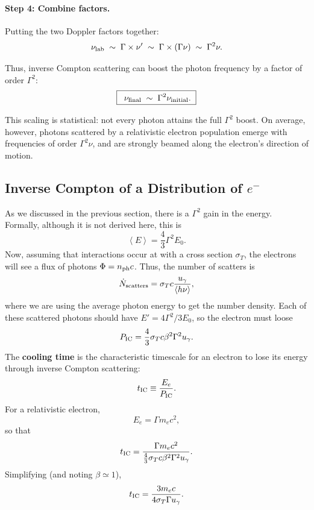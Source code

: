 \paragraph{Step 4: Combine factors.}
Putting the two Doppler factors together:
\[
    \nu_{\rm lab} \;\sim\; \Gamma \times \nu' \;\sim\; \Gamma \times (\Gamma\nu) \;\sim\; \Gamma^2 \nu.
\]

Thus, inverse Compton scattering can boost the photon frequency by a
factor of order $\Gamma^2$:
\begin{equation}
    \boxed{\;\;\nu_{\rm final} \;\sim\; \Gamma^2 \nu_{\rm initial}. \;}
\end{equation}

\begin{remark}
    This scaling is statistical: not every photon attains the full
    $\Gamma^2$ boost. On average, however, photons scattered by a
    relativistic electron population emerge with frequencies of order
    $\Gamma^2 \nu$, and are strongly beamed along the electron’s
    direction of motion.
\end{remark}

\subsection{Inverse Compton of a Distribution of $e^{-}$}

As we discussed in the previous section, there is a $\Gamma^2$ gain in the energy. Formally, although it is not derived here, this is
\[
\left<E\right> = \frac{4}{3}\Gamma^2 E_0.
\]
Now, assuming that interactions occur at with a cross section $\sigma_T$, the electrons will see a flux of photons $\Phi = n_{\rm ph} c$. Thus, the number of scatters is 
\[
\dot{N}_{\rm scatters} = \sigma_T c \frac{u_{\gamma}}{\left<h\nu\right>},
\]
where we are using the average photon energy to get the number density. Each of these scattered photons should have $E' = 4\Gamma^2/3 E_0$, so the electron must loose 
\[
P_{\rm IC} = \frac{4}{3}\sigma_T c \beta^2 \Gamma^2 u_{\gamma}.
\]
The \textbf{cooling time} is the characteristic timescale for an
electron to lose its energy through inverse Compton scattering:
\[
    t_{\rm IC} \equiv \frac{E_e}{P_{\rm IC}}.
\]
For a relativistic electron,
\[
    E_e = \Gamma m_e c^2,
\]
so that
\[
    t_{\rm IC} = 
    \frac{\Gamma m_e c^2}
         {\tfrac{4}{3}\sigma_T c \beta^2 \Gamma^2 u_\gamma}.
\]
Simplifying (and noting $\beta \simeq 1$),
\[
    t_{\rm IC} =
    \frac{3 m_e c}{4 \sigma_T \Gamma u_\gamma}.
\]

